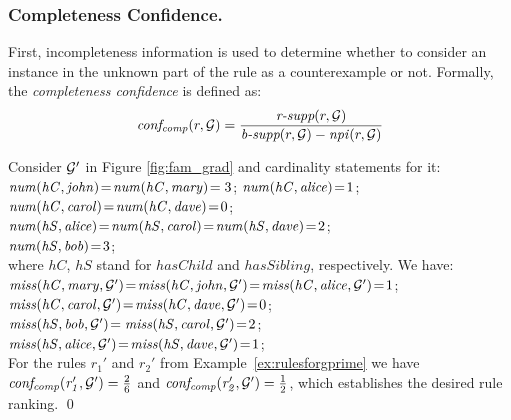 \subsubsection{Completeness Confidence.} First, incompleteness information is used to determine whether to consider an instance in the unknown part of the rule as a counterexample or not. Formally, the \emph{completeness confidence} is defined as:
\begin{align*}
\mathit{conf_{comp}}(r,\mathcal{G}) = \frac{\textit{r-supp}(r,\mathcal{G})}{\textit{b-supp}(r,\mathcal{G}) - \mathit{npi}(r,\mathcal{G})}
\end{align*}
\begin{example}
Consider $\mathcal{G}'$ in Figure \ref{fig:fam_grad}
and cardinality statements for it:\\
$\mathit{num(hC,john)}\!=\!\mathit{num(hC,mary)}\!=3$; $\mathit{num(hC,alice)}\!=\!1$; \\
$\mathit{num(hC,carol)}\!=\!\mathit{num(hC,dave)}\!=\!0$;\\
$\mathit{num(hS,alice)}\!=\!\mathit{num(hS,carol)}\!=\!\mathit{num(hS,dave)}\!=\!2$;\\ 
$\mathit{num(hS,bob)}\!=\!3$;\\
where $hC$, $hS$ stand for $hasChild$ and $hasSibling$, respectively. We have:\\
$\mathit{miss(hC,mary,\mathcal{G}')}\!=\!\mathit{miss(hC,john,\mathcal{G}')}\!=\!\mathit{miss(hC,alice,\mathcal{G}')}\!=\!1$;\\ 
$\mathit{miss(hC,carol,\mathcal{G}')}\!=\!\mathit{miss(hC,dave,\mathcal{G}')}\!=\!0$;\\
$\mathit{miss(hS,bob,\mathcal{G}')}\!=\mathit{miss(hS,carol,\mathcal{G}')}\!=\!2$;\\
$\mathit{miss(hS,alice,\mathcal{G}')}\!=\!\mathit{miss(hS,dave,\mathcal{G}')}\!=\!1$;\\
For the rules $r_1'$ and $r_2'$ from Example~\ref{ex:rulesforgprime} we have
 $\mathit{conf_{comp}(r_1', \mathcal{G}')}=\frac{2}{6}$ and $\mathit{conf_{comp}(r_2', \mathcal{G}')}=\frac{1}{2}$, which establishes the desired rule ranking.
\qed
\end{example}

